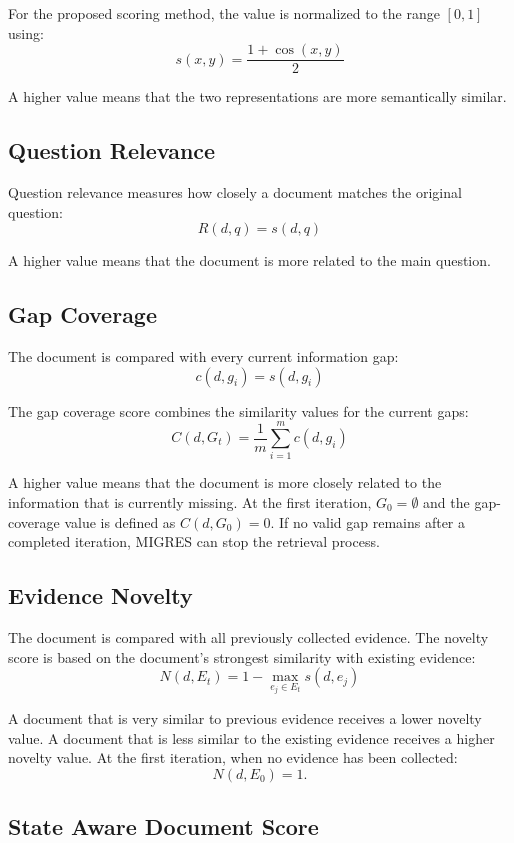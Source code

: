 \documentclass[12pt,a4paper]{report}
\begin{document}
For the proposed scoring method, the value is normalized to the range $[0,1]$ using:
\[
\boxed{
 s(x,y)=\frac{1+\operatorname{cos}(x,y)}{2}
}
\tag{1}
\]

A higher value means that the two representations are more semantically similar.

\subsection{Question Relevance}

Question relevance measures how closely a document matches the original question:
\[
\boxed{R(d,q)=s(d,q)}
\tag{2}
\]

A higher value means that the document is more related to the main question.

\subsection{Gap Coverage}

The document is compared with every current information gap:
\[
\boxed{c(d,g_i)=s(d,g_i)}
\tag{3}
\]

The gap coverage score combines the similarity values for the current gaps:
\[
\boxed{
C(d,G_t)=\frac{1}{m}\sum_{i=1}^{m}c(d,g_i)
}
\tag{4}
\]

A higher value means that the document is more closely related to the information that is currently missing. At the first iteration, $G_0=\emptyset$ and the gap-coverage value is defined as $C(d,G_0)=0$. If no valid gap remains after a completed iteration, MIGRES can stop the retrieval process.

\subsection{Evidence Novelty}

The document is compared with all previously collected evidence. The novelty score is based on the document's strongest similarity with existing evidence:
\[
\boxed{
N(d,E_t)=1-\max_{e_j\in E_t}s(d,e_j)
}
\tag{5}
\]

A document that is very similar to previous evidence receives a lower novelty value. A document that is less similar to the existing evidence receives a higher novelty value. At the first iteration, when no evidence has been collected:
\[
\boxed{N(d,E_0)=1.}
\tag{6}
\]

\subsection{State Aware Document Score}
\end{document}
